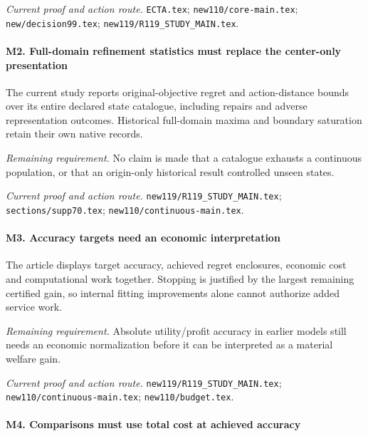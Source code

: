 \par\emph{Current proof and action route.} \nolinkurl{ECTA.tex}; \nolinkurl{new110/core-main.tex}; \nolinkurl{new/decision99.tex}; \nolinkurl{new119/R119_STUDY_MAIN.tex}.

\paragraph{M2. Full-domain refinement statistics must replace the center-only presentation}

The current study reports original-objective regret and action-distance bounds over its entire declared state catalogue, including repairs and adverse representation outcomes. Historical full-domain maxima and boundary saturation retain their own native records.

\par\emph{Remaining requirement.} No claim is made that a catalogue exhausts a continuous population, or that an origin-only historical result controlled unseen states.

\par\emph{Current proof and action route.} \nolinkurl{new119/R119_STUDY_MAIN.tex}; \nolinkurl{sections/supp70.tex}; \nolinkurl{new110/continuous-main.tex}.

\paragraph{M3. Accuracy targets need an economic interpretation}

The article displays target accuracy, achieved regret enclosures, economic cost and computational work together. Stopping is justified by the largest remaining certified gain, so internal fitting improvements alone cannot authorize added service work.

\par\emph{Remaining requirement.} Absolute utility/\allowbreak{}profit accuracy in earlier models still needs an economic normalization before it can be interpreted as a material welfare gain.

\par\emph{Current proof and action route.} \nolinkurl{new119/R119_STUDY_MAIN.tex}; \nolinkurl{new110/continuous-main.tex}; \nolinkurl{new110/budget.tex}.

\paragraph{M4. Comparisons must use total cost at achieved accuracy}

